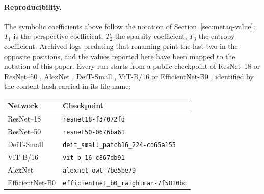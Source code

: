 \documentclass{article}
\begin{document}
\paragraph{Reproducibility.} The symbolic coefficients above follow the notation
of Section~\ref{sec:metaq-value}: $T_1$ is the perspective coefficient, $T_2$ the
sparsity coefficient, $T_3$ the entropy coefficient. Archived logs predating that
renaming print the last two in the opposite positions, and the values reported
here have been mapped to the notation of this paper. Every run starts from a
public checkpoint of ResNet--18 or ResNet--50 \citep{he2016resnet}, AlexNet
\citep{krizhevsky2012alexnet}, DeiT-Small \citep{touvron2021deit}, ViT-B/16
\citep{dosovitskiy2021vit} or EfficientNet-B0 \citep{tan2019efficientnet},
identified by the content hash carried in its file name:

\begin{center}
\small
\begin{tabular}{ll}
  \toprule
  Network & Checkpoint \\
  \midrule
  ResNet--18 & \texttt{resnet18-f37072fd} \\
  ResNet--50 & \texttt{resnet50-0676ba61} \\
  DeiT-Small & \texttt{deit\_small\_patch16\_224-cd65a155} \\
  ViT-B/16 & \texttt{vit\_b\_16-c867db91} \\
  AlexNet & \texttt{alexnet-owt-7be5be79} \\
  EfficientNet-B0 & \texttt{efficientnet\_b0\_rwightman-7f5810bc} \\
  \bottomrule
\end{tabular}
\end{center}
\end{document}
